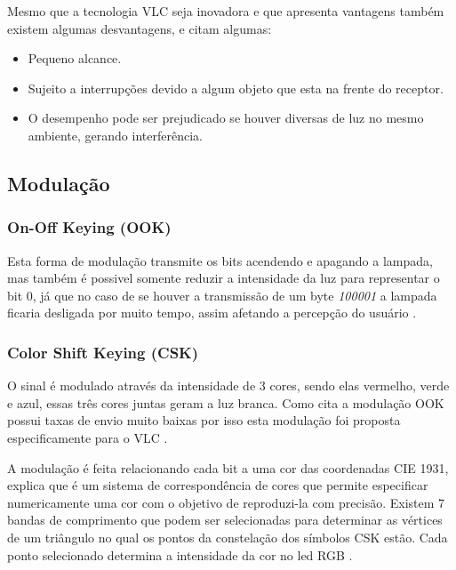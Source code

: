 Mesmo que a tecnologia VLC seja inovadora e que apresenta vantagens também existem algumas desvantagens, \citeauthor{matheus2017comunicaccao} e \citeauthor{conceiccao2015comunicaccao} citam algumas:

\begin{itemize}
  \item Pequeno alcance.
  \item Sujeito a interrupções devido a algum objeto que esta na frente do receptor.
  \item O desempenho pode ser prejudicado se houver diversas de luz no mesmo ambiente, gerando interferência.
\end{itemize}

\subsection{Modulação}

\subsubsection{On-Off Keying (OOK)}

Esta forma de modulação transmite os bits acendendo e apagando a lampada, mas também é possivel somente reduzir a intensidade da luz para representar o bit 0, já que no caso de se houver a transmissão de um byte \emph{100001} a lampada ficaria desligada por muito tempo, assim afetando a percepção do usuário \cite{matheus2017comunicaccao}.

\subsubsection{Color Shift Keying (CSK)}

O sinal é modulado através da intensidade de 3 cores, sendo elas vermelho, verde e azul, essas três cores juntas geram a luz branca. Como cita  a modulação OOK possui taxas de envio muito baixas por isso esta modulação foi proposta especificamente para o VLC \cite{matheus2017comunicaccao}. 

A modulação é feita relacionando cada bit a uma cor das coordenadas CIE 1931,  explica que é um sistema de correspondência de cores que permite especificar numericamente uma cor com o objetivo de reproduzi-la com precisão. Existem 7 bandas de comprimento que podem ser selecionadas para determinar as vértices de um triângulo no qual os pontos da constelação dos símbolos CSK estão. Cada ponto selecionado determina a intensidade da cor no led RGB \cite{matheus2017comunicaccao}.

